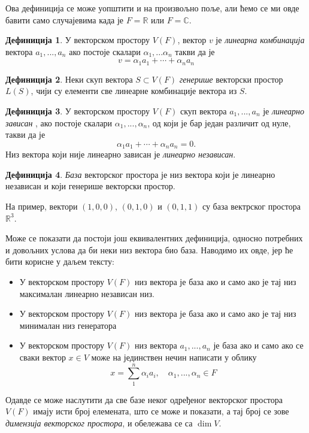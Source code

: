 \documentclass{report}
\theoremstyle{plain}
\theoremstyle{definition}
\newtheorem{defn}{Дефиниција}
\begin{document}
Ова дефиниција се може уопштити и на произвољно поље, али ћемо се ми овде бавити само случајевима када је $F=\mathbb{R}$ или $F=\mathbb{C}$.
\begin{defn}
У векторском простору $V(F)$, вектор $v$ је \emph{линеарна комбинација} вектора $a_1, ..., a_n$ ако постоје скалари $\alpha_1, ...\alpha_n$ такви да је $$v = \alpha_1 a_1+\cdots+\alpha_n a_n$$
\end{defn}
\begin{defn}
Неки скуп вектора $S\subset V(F)$ \emph{генерише} векторски простор $L(S)$, чији су елементи све линеарне комбинације вектора из $S$.
\end{defn}
\begin{defn}
У векторском простору $V(F)$ скуп вектора $a_1, ...,a_n$ је \emph{линеарно зависан} , ако постоје скалари $\alpha_1, ...,\alpha_n$, од који је бар један различит од нуле, такви да је $$\alpha_1 a_1 + \cdots+\alpha_n a_n = 0.$$ Низ вектора који није линеарно зависан је \emph{линеарно независан}.
\end{defn}
\begin{defn}
\emph{База} векторског простора је низ вектора који је линеарно независан и који генерише векторски простор.
\end{defn}
На пример, вектори $(1, 0, 0)$, $(0, 1, 0)$ и $(0, 1, 1)$ су база вектрског простора $\mathbb{R}^3$.

Може се показати да постоји још еквивалентних дефиниција, односно потребних и довољних услова да би неки низ вектора био база. Наводимо их овде, јер ће бити корисне у даљем тексту:
\begin{itemize}
  \item У векторском простору $V(F)$ низ вектора је база ако и само ако је тај низ максималан линеарно независан низ.
  \item У векторском простору $V(F)$ низ вектора је база ако и само ако је тај низ минималан низ генератора
  \item У векторском простору $V(F)$ низ вектора $a_1, ..., a_n$ је база ако и само ако се сваки вектор $x\in V$ може на јединствен нечин написати у облику $$x = \sum_1^n\alpha_i a_i, \quad \alpha_1, ..., \alpha_n\in F$$
\end{itemize}
Одавде се може наслутити да све базе неког одређеног векторског простора $V(F)$ имају исти број елемената, што се може и показати, а тај број се зове \emph{димензија векторског простора}, и обележава се са $\operatorname{dim} V$.\\
\end{document}
